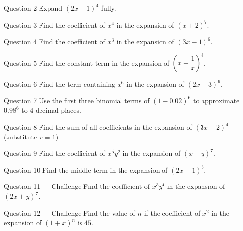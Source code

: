 \documentclass[11pt]{article}
\begin{document}
\begin{qbox}{Question 2}
Expand $(2x-1)^4$ fully.\workspace{2.4cm}
\end{qbox}

\begin{qbox}{Question 3}
Find the coefficient of $x^4$ in the expansion of $(x+2)^7$.\workspace{2.4cm}
\end{qbox}

\begin{qbox}{Question 4}
Find the coefficient of $x^3$ in the expansion of $(3x-1)^6$.\workspace{2.4cm}
\end{qbox}

\begin{qbox}{Question 5}
Find the constant term in the expansion of $\left(x+\dfrac{1}{x}\right)^8$.\workspace{2.4cm}
\end{qbox}

\begin{qbox}{Question 6}
Find the term containing $x^6$ in the expansion of $(2x-3)^9$.\workspace{2.4cm}
\end{qbox}

\begin{qbox}{Question 7}
Use the first three binomial terms of $(1-0.02)^6$ to approximate $0.98^6$ to 4 decimal places.\workspace{2.4cm}
\end{qbox}

\begin{qbox}{Question 8}
Find the sum of all coefficients in the expansion of $(3x-2)^4$ (substitute $x=1$).\workspace{2.4cm}
\end{qbox}

\begin{qbox}{Question 9}
Find the coefficient of $x^5y^2$ in the expansion of $(x+y)^7$.\workspace{2.4cm}
\end{qbox}

\begin{qbox}{Question 10}
Find the middle term in the expansion of $(2x-1)^6$.\workspace{2.4cm}
\end{qbox}

\begin{qbox}{Question 11 --- Challenge}
Find the coefficient of $x^3y^4$ in the expansion of $(2x+y)^7$.\workspace{3.2cm}
\end{qbox}

\begin{qbox}{Question 12 --- Challenge}
Find the value of $n$ if the coefficient of $x^2$ in the expansion of $(1+x)^n$ is $45$.\workspace{3.4cm}
\end{qbox}
\end{document}
